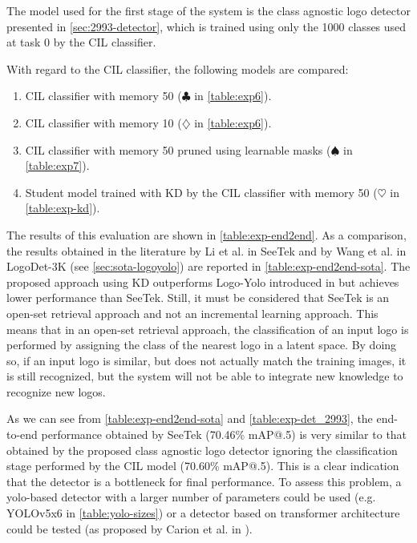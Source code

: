 The model used for the first stage of the system is the class agnostic logo detector presented in \autoref{sec:2993-detector}, which is trained using only the 1000 classes used at task 0 by the CIL classifier.

With regard to the CIL classifier, the following models are compared:
\begin{enumerate}
    \item CIL classifier with memory 50 ($\clubsuit$ in \autoref{table:exp6}).
    \item CIL classifier with memory 10 ($\diamondsuit$ in \autoref{table:exp6}).
    \item CIL classifier with memory 50 pruned using learnable masks ($\spadesuit$ in \autoref{table:exp7}).
    \item Student model trained with KD by the CIL classifier with memory 50 ($\heartsuit$ in \autoref{table:exp-kd}).
\end{enumerate}

The results of this evaluation are shown in \autoref{table:exp-end2end}. As a comparison, the results obtained in the literature by Li et al. in SeeTek \cite{li2022seetek} and by Wang et al. in LogoDet-3K \cite{wang2022logodet} (see \autoref{sec:sota-logoyolo}) are reported in \autoref{table:exp-end2end-sota}. The proposed approach using KD outperforms Logo-Yolo introduced in \cite{wang2022logodet} but achieves lower performance than SeeTek.
Still, it must be considered that SeeTek is an open-set retrieval approach and not an incremental learning approach.
This means that in an open-set retrieval approach, the classification of an input logo is performed by assigning the class of the nearest logo in a latent space. By doing so, if an input logo is similar, but does not actually match the training images, it is still recognized, but the system will not be able to integrate new knowledge to recognize new logos.

As we can see from \autoref{table:exp-end2end-sota} and \autoref{table:exp-det_2993}, the end-to-end performance obtained by SeeTek (70.46\% mAP@.5) is very similar to that obtained by the proposed class agnostic logo detector ignoring the classification stage performed by the CIL model (70.60\% mAP@.5). This is a clear indication that the detector is a bottleneck for final performance. To assess this problem, a yolo-based detector with a larger number of parameters could be used (e.g. YOLOv5x6 in \autoref{table:yolo-sizes}) or a detector based on transformer architecture could be tested (as proposed by Carion et al. in \cite{carion2020end}).

